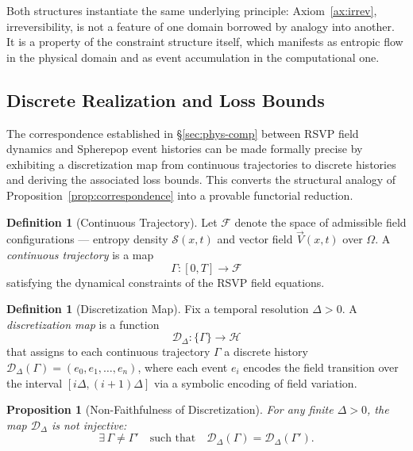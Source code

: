 \documentclass[12pt, twoside]{article}
\theoremstyle{plain}
\newtheorem{proposition}[theorem]{Proposition}
\theoremstyle{definition}
\newtheorem{definition}[theorem]{Definition}
\theoremstyle{remark}
\begin{document}
Both structures instantiate the same underlying principle:
Axiom~\ref{ax:irrev}, irreversibility, is not a feature
of one domain borrowed by analogy into another.
It is a property of the constraint structure itself,
which manifests as entropic flow in the physical domain
and as event accumulation in the computational one.

\subsection{Discrete Realization and Loss Bounds}

The correspondence established in \S\ref{sec:phys-comp} between
RSVP field dynamics and Spherepop event histories can be made
formally precise by exhibiting a discretization map from
continuous trajectories to discrete histories and deriving
the associated loss bounds.
This converts the structural analogy of Proposition~\ref{prop:correspondence}
into a provable functorial reduction.

\begin{definition}[Continuous Trajectory]
Let $\mathcal{F}$ denote the space of admissible field configurations —
entropy density $\mathcal{S}(x,t)$ and vector field $\vec{V}(x,t)$
over $\Omega$.
A \emph{continuous trajectory} is a map
\[
  \Gamma : [0,T] \to \mathcal{F}
\]
satisfying the dynamical constraints of the RSVP field equations.
\end{definition}

\begin{definition}[Discretization Map]
Fix a temporal resolution $\Delta > 0$.
A \emph{discretization map} is a function
\[
  \mathcal{D}_\Delta : \{\Gamma\} \to \mathcal{H}
\]
that assigns to each continuous trajectory $\Gamma$ a discrete history
$\mathcal{D}_\Delta(\Gamma) = (e_0, e_1, \dots, e_n)$,
where each event $e_i$ encodes the field transition over the interval
$[i\Delta, (i+1)\Delta]$ via a symbolic encoding of field variation.
\end{definition}

\begin{proposition}[Non-Faithfulness of Discretization]
\label{prop:nonfaith-disc}
For any finite $\Delta > 0$, the map $\mathcal{D}_\Delta$ is not injective:
\[
  \exists\, \Gamma \neq \Gamma' \quad \text{such that} \quad
  \mathcal{D}_\Delta(\Gamma) = \mathcal{D}_\Delta(\Gamma').
\]
\end{proposition}
\end{document}
